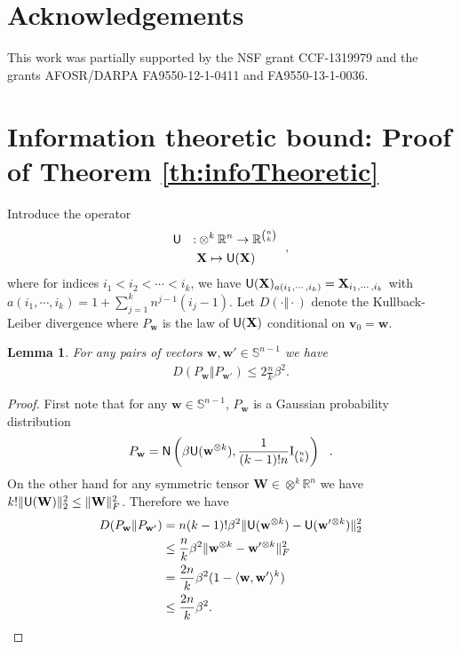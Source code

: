 \documentclass[11pt]{article}
\newtheorem{lemma}[claim]{Lemma}
\theoremstyle{definition}
\def\<{\langle}
\def\>{\rangle}
\def\reals{\mathbb{R}}
\def\bv{\mathbf{v}}
\def\bw{\mathbf{w}}
\def\bX{\mathbf{X}}
\def\sU{{\sf{U}}}
\def\bW{\mathbf{W}}
\def\bbS{\mathbb{S}}
\def\normal{{\sf N}}
\def\ok{{^{\otimes k}}}
\def\id{{\rm I}}
\begin{document}
\section*{Acknowledgements}

This work was partially supported by the NSF grant CCF-1319979 and the grants AFOSR/DARPA
FA9550-12-1-0411 and FA9550-13-1-0036.

%

\appendix 

\section{Information theoretic bound: Proof of Theorem \ref{th:infoTheoretic}}
\label{app:ITBound}


Introduce the operator 
\[ \begin{aligned} \sU~~:& \otimes^k \reals^n \to \reals^{{n \choose k}}\\ & \bX \mapsto \sU(\bX)\end{aligned}~~,\]
where for indices $i_1<i_2<\cdots < i_k$, we have $\sU(\bX)_{a(i_1, \cdots, i_k)} = \bX_{i_1,\cdots, i_k}$ with $a(i_1, \cdots, i_k) = 1+\sum_{j=1}^k n^{j-1}(i_j-1)$. Let  $D(\cdot \Vert\cdot)$ denote
  the Kullback-Leiber divergence where $P_\bw$ is the law of $ \sU(\bX)$ conditional
  on $\bv_0=\bw$.  
\begin{lemma}\label{lem:Kullback} For any pairs of vectors $\bw,\bw' \in \bbS^{n-1}$ we have
  \begin{align*}
    D(P_\bw \Vert P_{\bw'}) \le 2 \frac{n}{k}\beta^2.
  \end{align*}
\end{lemma}
%
\begin{proof}
First note that for any $\bw \in \bbS^{n-1}$, $P_\bw$ is a Gaussian
probability distribution $$P_\bw = \normal \left ( \beta  \sU( \bw\ok) , \frac{1}{(k-1)! n}\id_{{n \choose k}} \right ) ~~.$$
On the other hand for any symmetric tensor $\bW \in \otimes^k \reals^n$ we have $k! \|\sU(\bW)\|_2^2\leq \|\bW\|_F^2$. Therefore we have
  \begin{align*}
    D(P_\bw \Vert P_{\bw'}) &= n(k-1)!  \beta^2  \|\sU(\bw\ok) - \sU(\bw'\ok)\|_2^2 \\
    &\le \frac{n}{k}\beta^2\|\bw\ok - \bw'\ok\|_F^2 \\
    &=  \frac{2 n}{k}\beta^2(1-\<\bw, \bw'\>^k) \\
    &\le  \frac{2 n}{k}\beta^2.
  \end{align*}

\end{proof}
\end{document}
